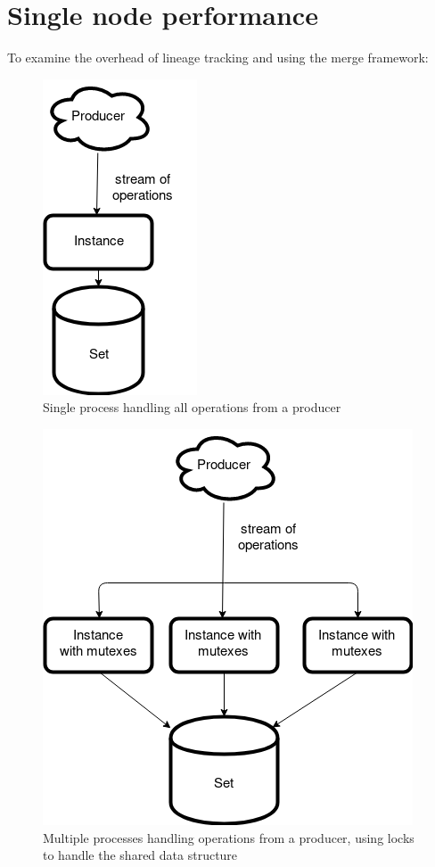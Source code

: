 \documentclass{article}
\begin{document}
\section{Single node performance}
To examine the overhead of lineage tracking and using the merge framework:
\begin{figure}[ht]
\centering
\caption{Single process handling all operations from a producer}
\includegraphics[width=0.2\textheight]{benchmark-single.png}
\end{figure}
\begin{figure}[ht]
\centering
\caption{Multiple processes handling operations from a producer, using locks to handle the shared data structure}
\includegraphics[width=0.3\textheight]{benchmark-mutexes.png}
\end{figure}
\end{document}
